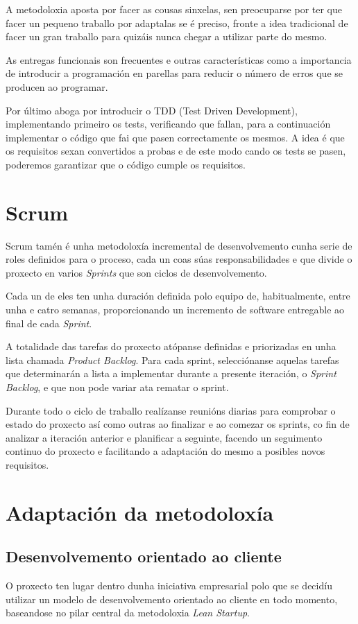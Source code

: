  A metodoloxia aposta por facer as cousas sinxelas, sen preocuparse por ter 
que facer un pequeno traballo por adaptalas se é preciso, fronte a idea 
tradicional de facer un gran traballo para quizáis nunca chegar a utilizar 
parte do mesmo.

  As entregas funcionais son frecuentes e outras características como a 
importancia de introducir a programación en parellas para reducir o número de 
erros que se producen ao programar.

  Por último aboga por introducir o TDD (Test Driven 
Development)\cite{book:cleancode}, implementando primeiro os tests, 
verificando que fallan, para a continuación implementar o código que fai que 
pasen correctamente os mesmos.
  A idea é que os requisitos sexan convertidos a probas e de este modo cando os 
tests se pasen, poderemos garantizar que o código cumple os requisitos.

  \section{Scrum}
  Scrum\cite{book:scrum} tamén é unha metodoloxía incremental de desenvolvemento 
cunha serie de roles definidos para o proceso, cada un coas súas 
responsabilidades e que divide o proxecto en varios \emph{Sprints} que son 
ciclos de desenvolvemento.

  Cada un de eles ten unha duración definida polo equipo de, habitualmente, 
entre unha e catro semanas, proporcionando un incremento de software entregable 
ao final de cada \emph{Sprint}.

  A totalidade das tarefas do proxecto atópanse definidas e priorizadas en unha 
lista chamada \emph{Product Backlog}. Para cada sprint, selecciónanse aquelas 
tarefas que determinarán a lista a implementar durante a presente iteración, o
\emph{Sprint Backlog}, e que non pode variar ata rematar o sprint.

  Durante todo o ciclo de traballo realízanse reunións diarias para comprobar o 
estado do proxecto así como outras ao finalizar e ao comezar os sprints, co 
fin de analizar a iteración anterior e planificar a seguinte, facendo un 
seguimento continuo do proxecto e facilitando a adaptación do mesmo a posibles 
novos requisitos.

  \section{Adaptación da metodoloxía}

    \subsection{Desenvolvemento orientado ao cliente}
      O proxecto ten lugar dentro dunha iniciativa empresarial polo que se 
decidíu utilizar un modelo de desenvolvemento orientado ao cliente en todo 
momento, baseandose no pilar central da metodoloxia \emph{Lean Startup}.

